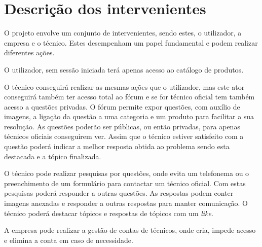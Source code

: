 \section{Descrição dos intervenientes}
O projeto envolve um conjunto de intervenientes, sendo estes, o utilizador, a empresa e o técnico. Estes desempenham um papel fundamental e podem realizar diferentes ações.

O utilizador, sem sessão iniciada terá apenas acesso ao catálogo de produtos.

O técnico conseguirá realizar as mesmas ações que o utilizador, mas este ator conseguirá também ter acesso total ao fórum e se for técnico oficial tem também acesso a questões privadas. O fórum permite expor questões, com auxílio de imagens, a ligação da questão a uma categoria e um produto para facilitar a sua resolução. As questões poderão ser públicas, ou então privadas, para apenas técnicos oficiais conseguirem ver. Assim que o técnico estiver satisfeito com a questão poderá indicar a melhor resposta obtida ao problema sendo esta destacada e a tópico finalizada.

O técnico pode realizar pesquisas por questões, onde evita um telefonema ou o preenchimento de um formulário para contactar um técnico oficial. Com estas pesquisas poderá responder a outras questões. As respostas podem conter imagens anexadas e responder a outras respostas para manter comunicação. O técnico poderá destacar tópicos e respostas de tópicos com um \textit{like}.

A empresa pode realizar a gestão de contas de técnicos, onde cria, impede acesso e elimina a conta em caso de necessidade.
